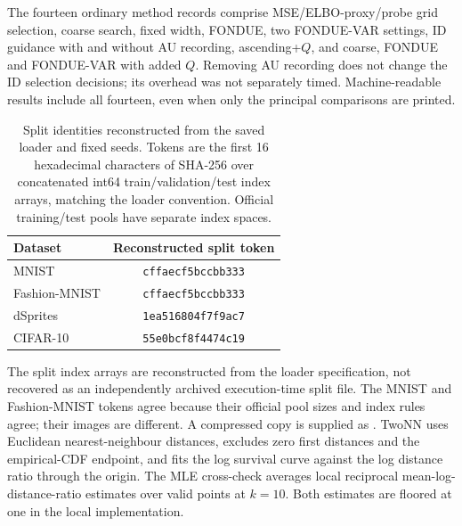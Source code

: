 \documentclass[make,article,submit,pdftex,moreauthors]{Definitions/mdpi}
\begin{document}
The fourteen ordinary method records comprise MSE/ELBO-proxy/probe grid
selection, coarse search, fixed width, FONDUE, two FONDUE-VAR settings,
ID guidance with and without AU recording, ascending+$Q$, and coarse,
FONDUE and FONDUE-VAR with added $Q$. Removing AU recording does not
change the ID selection decisions; its overhead was not separately
timed. Machine-readable results include all fourteen, even when only
the principal comparisons are printed.

\begin{table}[H]
\caption{Split identities reconstructed from the saved loader and fixed seeds. Tokens are the first 16 hexadecimal characters of SHA-256 over concatenated int64 train/validation/test index arrays, matching the loader convention. Official training/test pools have separate index spaces.}\label{tab:splits}
\small
\setlength{\tabcolsep}{3.5pt}
\begin{tabular*}{\textwidth}{@{\extracolsep{\fill}}lc@{}}
\toprule
Dataset & Reconstructed split token \\
\midrule
MNIST & \texttt{cffaecf5bccbb333} \\
Fashion-MNIST & \texttt{cffaecf5bccbb333} \\
dSprites & \texttt{1ea516804f7f9ac7} \\
CIFAR-10 & \texttt{55e0bcf8f4474c19} \\
\bottomrule
\end{tabular*}
\end{table}

The split index arrays are reconstructed from the loader specification,
not recovered as an independently archived execution-time split file.
The MNIST and Fashion-MNIST tokens agree because their official pool
sizes and index rules agree; their images are different. A compressed
copy is supplied as .
TwoNN uses Euclidean nearest-neighbour distances, excludes zero first
distances and the empirical-CDF endpoint, and fits the log survival
curve against the log distance ratio through the origin. The MLE
cross-check averages local reciprocal mean-log-distance-ratio estimates
over valid points at $k=10$. Both estimates are floored at one in the
local implementation.
\end{document}
